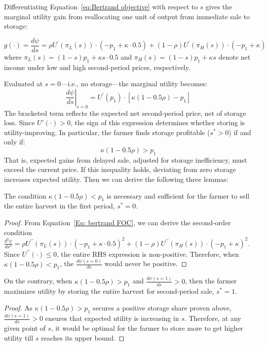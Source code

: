 Differentiating Equation~\ref{eq:Bertrand objective} with respect to $s$ gives the marginal utility gain from reallocating one unit of output from immediate sale to storage:

\begin{equation}
g(\cdot) = \frac{d\psi}{ds} = \rho U^{\prime}(\pi_L(s)) \cdot (-p_1 + \kappa \cdot 0.5) + (1 - \rho) U^{\prime}(\pi_H(s)) \cdot (-p_1 + \kappa)
\label{Eq: bertrand FOC}
\end{equation}
where $\pi_L(s) = (1 - s)p_1 + \kappa s \cdot 0.5$ and $\pi_H(s) = (1 - s)p_1 + \kappa s$ denote net income under low and high second-period prices, respectively.

Evaluated at $s = 0$—i.e., no storage—the marginal utility becomes:
$$
\left.\frac{d\psi}{ds}\right|_{s=0} = U^{\prime}(p_1) \cdot \left[\kappa(1 - 0.5\rho ) - p_1\right]
$$
The bracketed term reflects the expected net second-period price, net of storage loss. Since $U'(\cdot) > 0$, the sign of this expression determines whether storing is utility-improving. In particular, the farmer finds storage profitable ($s^* > 0$) if and only if:
$$
\kappa(1 - 0.5\rho) > p_1
$$
That is, expected gains from delayed sale, adjusted for storage inefficiency, must exceed the current price. If this inequality holds, deviating from zero storage increases expected utility. Then we can derive the following three lemmas:
\begin{lemma}
    The condition $\kappa (1 - 0.5\rho) < p_1$ is necessary and sufficient for the farmer to sell the entire harvest in the first period, $s^*=0$.
        \label{lemma: Bertrand no storage solution}
\end{lemma}
\begin{proof}
    From Equation~\ref{Eq: bertrand FOC}, we can derive the second-order condition $\frac{d^2 \psi}{d s^2} = \rho U^{\prime \prime}\left(\pi_L(s)\right) \cdot\left(-p_1+ \kappa \cdot 0.5\right)^2+(1-\rho) U^{\prime \prime}\left(\pi_H(s)\right) \cdot\left(-p_1+\kappa\right)^2$. Since $U^{\prime\prime}(\cdot)\leq0$, the entire RHS expression is non-positive. Therefore, when $\kappa (1-0.5\rho) < p_1 $, the $\frac{d \psi(s=0)}{d s}$ would never be positive.
\end{proof}


\begin{lemma}
    On the contrary, when $\kappa (1-0.5\rho) > p_1 $ and $\frac{d \psi(s=1)}{d s}>0$, then the farmer maximizes utility by storing the entire harvest for second-period sale, $s^*=1$.
    \label{lemma: Bertrand full storage solution}
\end{lemma}
\begin{proof}
    As $\kappa (1-0.5\rho) > p_1 $ secures a positive storage share proven above, $\frac{d \psi(s=1)}{d s}>0$ ensures that expected utility is increasing in $s$. Therefore, at any given point of $s$, it would be optimal for the farmer to store more to get higher utility till $s$ reaches its upper bound.
\end{proof}


